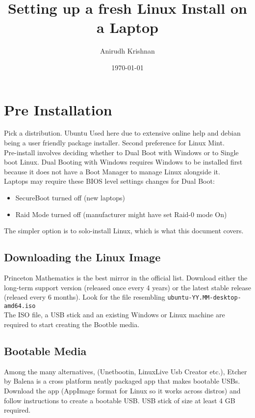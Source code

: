 \documentclass[10pt,letterpaper,twocolumn]{article}
\title{Setting up a fresh Linux Install on a Laptop}
\author{Anirudh Krishnan}
\date{\today}
\begin{document}
\maketitle
\newpage

\tableofcontents
\newpage

\section{Pre Installation}

Pick a distribution. Ubuntu Used here due to extensive online help and debian being a user friendly package installer. Second preference for Linux Mint. \\

Pre-install involves deciding whether to Dual Boot with Windows or to Single boot Linux. Dual Booting with Windows requires Windows to be installed first because it does not have a Boot Manager to manage Linux alongside it. \\

Laptops may require these BIOS level settings changes for Dual Boot:

\begin{itemize}
	\item SecureBoot turned off (new laptops)
	\item Raid Mode turned off (manufacturer might have set Raid-0 mode On)
\end{itemize}

The simpler option is to solo-install Linux, which is what this document covers.

\subsection{Downloading the Linux Image}

Princeton Mathematics is the best mirror in the official list. Download either the long-term support version (released once every 4 years) or the latest stable release (releaed every 6 months). Look for the file resembling \texttt{ubuntu-YY.MM-desktop-amd64.iso} \\

The ISO file, a USB stick and an existing Windows or Linux machine are required to start creating the Bootble media.



\subsection{Bootable Media}
Among the many alternatives, (Unetbootin, LinuxLive Usb Creator etc.), Etcher by Balena is a cross platform neatly packaged app that makes bootable USBs. Download the app (AppImage format for Linux so it works across distros) and follow instructions to create a bootable USB. USB stick of size at least 4 GB required.\\
\end{document}
